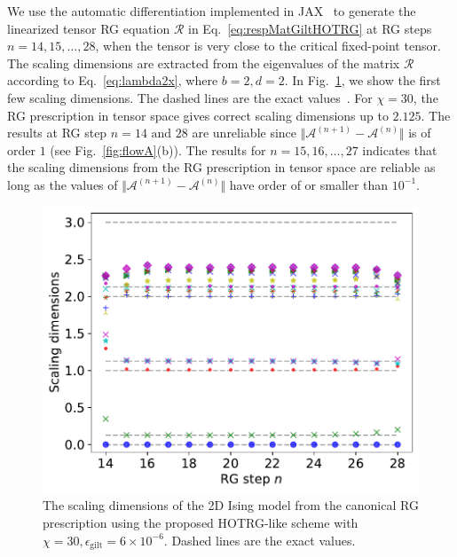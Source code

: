 \documentclass[aps,prr,reprint,superscriptaddress,nofootinbib,floatfix]{revtex4-2}
\begin{document}
We use the automatic differentiation implemented in JAX~\cite{jax2018github} to generate the linearized tensor RG equation $\mathcal{R}$ in Eq.~\eqref{eq:respMatGiltHOTRG} at RG steps $n = 14,15,\ldots, 28$, when the tensor is very close to the critical fixed-point tensor. 
The scaling dimensions are extracted from the eigenvalues of the matrix $\mathcal{R}$ according to Eq.~\eqref{eq:lambda2x}, where $b = 2, d = 2$. 
In Fig.~\ref{fig:scDim}, we show the first few scaling dimensions. 
The dashed lines are the exact values~\cite{DiFrancesco1997}. 
For $\chi = 30$, the RG prescription in tensor space gives correct scaling dimensions up to $2.125$. 
The results at RG step $n = 14 \text{ and } 28$ are unreliable since $\Vert \mathcal{A}^{(n+1)} - \mathcal{A}^{(n)}\Vert$ is of order $1$ (see Fig.~\ref{fig:flowA}(b)). 
The results for $n = 15,16,\ldots,27$ indicates that the scaling dimensions from the RG prescription in tensor space are reliable as long as the values of $\Vert \mathcal{A}^{(n+1)} - \mathcal{A}^{(n)}\Vert$ have order of or smaller than $10^{-1}$. 
%
\begin{figure}[tb]
    \includegraphics[width=\columnwidth]{scDim.pdf}
    \caption{\label{fig:scDim}
        The scaling dimensions of the 2D Ising model from the canonical RG prescription using the proposed HOTRG-like scheme with $\chi = 30, \epsilon_{\text{gilt}} = 6\times 10^{-6}$.
    Dashed lines are the exact values.}
\end{figure}
\end{document}
